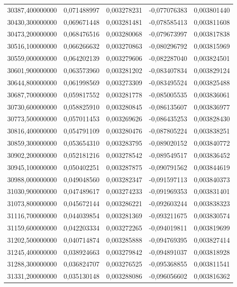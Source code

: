 \begin{longtable}{rrrrr}
30387,400000000 & 0,071488997 & 0,003278231 & -0,077076383 & 0,003801440\\
30430,300000000 & 0,069671448 & 0,003281481 & -0,078585413 & 0,003811608\\
30473,200000000 & 0,068476516 & 0,003280068 & -0,079673997 & 0,003817838\\
30516,100000000 & 0,066266632 & 0,003270863 & -0,080296792 & 0,003815969\\
30559,000000000 & 0,064202139 & 0,003279606 & -0,082287040 & 0,003824501\\
30601,900000000 & 0,063573960 & 0,003281202 & -0,083407834 & 0,003829124\\
30644,800000000 & 0,061998569 & 0,003273309 & -0,083495524 & 0,003825488\\
30687,700000000 & 0,059817552 & 0,003281778 & -0,085005535 & 0,003836061\\
30730,600000000 & 0,058825910 & 0,003280845 & -0,086135607 & 0,003836977\\
30773,500000000 & 0,057011453 & 0,003269626 & -0,086435253 & 0,003828430\\
30816,400000000 & 0,054791109 & 0,003280476 & -0,087805224 & 0,003838251\\
30859,300000000 & 0,053654310 & 0,003283795 & -0,089020152 & 0,003840772\\
30902,200000000 & 0,052181216 & 0,003278542 & -0,089549517 & 0,003836452\\
30945,100000000 & 0,050402251 & 0,003287875 & -0,090791562 & 0,003844619\\
30988,000000000 & 0,049048560 & 0,003282347 & -0,091597113 & 0,003840373\\
31030,900000000 & 0,047489617 & 0,003274233 & -0,091969353 & 0,003831401\\
31073,800000000 & 0,045672144 & 0,003286221 & -0,092603244 & 0,003838323\\
31116,700000000 & 0,044039854 & 0,003281369 & -0,093211675 & 0,003830574\\
31159,600000000 & 0,042203334 & 0,003272265 & -0,094019811 & 0,003819699\\
31202,500000000 & 0,040714874 & 0,003285888 & -0,094769395 & 0,003827414\\
31245,400000000 & 0,038924663 & 0,003279842 & -0,094891037 & 0,003818928\\
31288,300000000 & 0,036824707 & 0,003276525 & -0,095368855 & 0,003811541\\
31331,200000000 & 0,035130148 & 0,003288086 & -0,096056602 & 0,003816362\\

\end{longtable}
